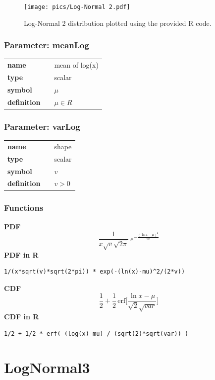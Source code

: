 \documentclass{article}
\begin{document}
\begin{figure}[ht!]
\centering
  \texttt{[image: pics/Log-Normal 2.pdf]}
 \caption{Log-Normal 2 distribution plotted using the provided R code.}
 \label{fig:Log-Normal 2}
\end{figure}

\subsubsection*{Parameter: meanLog}

\noindent\begin{tabular}{p{2cm}cl}
\textbf{name} & & mean of log(x) \\
\textbf{type} & & scalar \\
\textbf{symbol} & & $\mu$  \\
\textbf{definition} & & $\mu \in R$
\end{tabular}
\subsubsection*{Parameter: varLog}

\noindent\begin{tabular}{p{2cm}cl}
\textbf{name} & & shape \\
\textbf{type} & & scalar \\
\textbf{symbol} & & $v$  \\
\textbf{definition} & & $v > 0$
\end{tabular}
\subsubsection*{Functions}

\smallskip \noindent \hspace{.2cm} \textbf{PDF} 
\begin{equation*}\frac{1}{x\sqrt{v}\sqrt{2\pi}}\ e^{-\frac{\left(\ln x-\mu\right)^2}{2 v}}\end{equation*}
\smallskip \noindent \hspace{.2cm} \textbf{PDF in R}  
\begin{verbatim}1/(x*sqrt(v)*sqrt(2*pi)) * exp(-(ln(x)-mu)^2/(2*v))\end{verbatim}
\smallskip \noindent \hspace{.2cm} \textbf{CDF} 
\begin{equation*}\frac12 + \frac12\,\text{erf}\Big[\frac{\ln x-\mu}{\sqrt{2}\sqrt{var}}\Big]\end{equation*}
\smallskip \noindent \hspace{.2cm} \textbf{CDF in R} 
\begin{verbatim}1/2 + 1/2 * erf( (log(x)-mu) / (sqrt(2)*sqrt(var)) )\end{verbatim}
\smallskip\section*{LogNormal3} 
\end{document}
